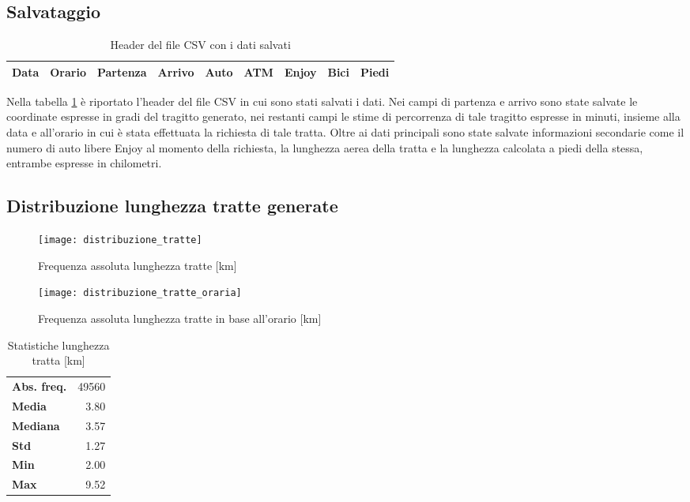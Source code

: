 \subsection{Salvataggio}

\begin{table}[H]
\centering
\begin{tabular}{ | c | c | c | c | c | c | c | c | c | }
\hline
Data & Orario & Partenza & Arrivo & Auto & ATM & Enjoy & Bici & Piedi \\
\hline
\end{tabular}
\caption{Header del file CSV con i dati salvati}
\label{table:7}
\end{table}

Nella tabella \ref{table:7} è riportato l'header del file CSV in cui sono stati salvati i dati. Nei campi di partenza e arrivo sono state salvate le coordinate espresse in gradi del tragitto generato, nei restanti campi le stime di percorrenza di tale tragitto espresse in minuti, insieme alla data e all'orario in cui è stata effettuata la richiesta di tale tratta. Oltre ai dati principali sono state salvate informazioni secondarie come il numero di auto libere Enjoy al momento della richiesta, la lunghezza aerea della tratta e la lunghezza calcolata a piedi della stessa, entrambe espresse in chilometri.

\subsection{Distribuzione lunghezza tratte generate}

\begin{figure}[H]
\texttt{[image: distribuzione\_tratte]}
\caption{Frequenza assoluta lunghezza tratte [km]}
\label{image:2}
\end{figure}

\begin{figure}[H]
	\texttt{[image: distribuzione\_tratte\_oraria]}
	\caption{Frequenza assoluta lunghezza tratte in base all'orario [km]}
	\label{image:19}
\end{figure}

\begin{table}[H]
\centering
\begin{tabular}{ | l r | }
\hline
\textbf{Abs. freq.} & 49560 \\
\textbf{Media} & 3.80 \\
\textbf{Mediana} & 3.57 \\
\textbf{Std} & 1.27 \\
\textbf{Min} & 2.00 \\
\textbf{Max} & 9.52 \\
\hline
\end{tabular}
\caption{Statistiche lunghezza tratta [km]}
\label{table:2}
\end{table}

